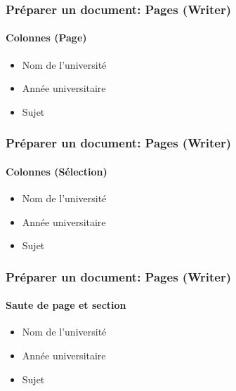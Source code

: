 \documentclass[xcolor=table]{beamer}
\begin{document}
\begin{frame}[t]
\frametitle{Préparer un document: Pages (Writer)}
\framesubtitle{Colonnes (Page)}

\begin{minipage}{0.38\textwidth}
\begin{itemize}
\item Nom de l'université 
\item Année universitaire
\item Sujet
\end{itemize}
\end{minipage}
\begin{minipage}{0.6\textwidth}
\end{minipage}

\end{frame}

\begin{frame}[t]
\frametitle{Préparer un document: Pages (Writer)}
\framesubtitle{Colonnes (Sélection)}

\begin{minipage}{0.38\textwidth}
	\begin{itemize}
		\item Nom de l'université 
		\item Année universitaire
		\item Sujet
	\end{itemize}
\end{minipage}
\begin{minipage}{0.6\textwidth}
\end{minipage}

\end{frame}

\begin{frame}[t]
\frametitle{Préparer un document: Pages (Writer)}
\framesubtitle{Saute de page et section}

\begin{minipage}{0.38\textwidth}
\begin{itemize}
\item Nom de l'université 
\item Année universitaire
\item Sujet
\end{itemize}
\end{minipage}
\begin{minipage}{0.6\textwidth}

\vspace{6pt}
\end{minipage}

\end{frame}
\end{document}
